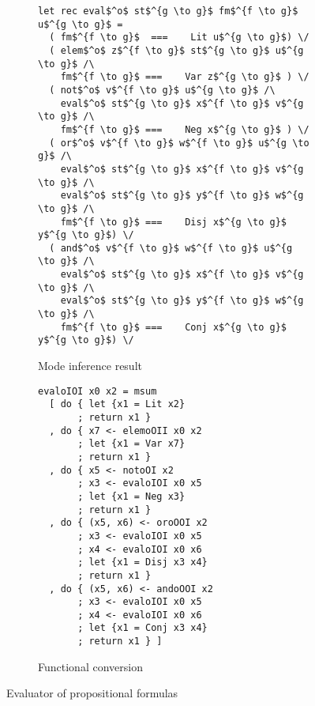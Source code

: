\begin{figure}[h]
  \centering
  \begin{subfigure}[b]{0.45\textwidth}
    \begin{lstlisting}[frame=tb]
let rec eval$^o$ st$^{g \to g}$ fm$^{f \to g}$ u$^{g \to g}$ =
  ( fm$^{f \to g}$  ===    Lit u$^{g \to g}$) \/
  ( elem$^o$ z$^{f \to g}$ st$^{g \to g}$ u$^{g \to g}$ /\
    fm$^{f \to g}$ ===    Var z$^{g \to g}$ ) \/
  ( not$^o$ v$^{f \to g}$ u$^{g \to g}$ /\
    eval$^o$ st$^{g \to g}$ x$^{f \to g}$ v$^{g \to g}$ /\
    fm$^{f \to g}$ ===    Neg x$^{g \to g}$ ) \/
  ( or$^o$ v$^{f \to g}$ w$^{f \to g}$ u$^{g \to g}$ /\
    eval$^o$ st$^{g \to g}$ x$^{f \to g}$ v$^{g \to g}$ /\
    eval$^o$ st$^{g \to g}$ y$^{f \to g}$ w$^{g \to g}$ /\
    fm$^{f \to g}$ ===    Disj x$^{g \to g}$ y$^{g \to g}$) \/
  ( and$^o$ v$^{f \to g}$ w$^{f \to g}$ u$^{g \to g}$ /\
    eval$^o$ st$^{g \to g}$ x$^{f \to g}$ v$^{g \to g}$ /\
    eval$^o$ st$^{g \to g}$ y$^{f \to g}$ w$^{g \to g}$ /\
    fm$^{f \to g}$ ===    Conj x$^{g \to g}$ y$^{g \to g}$) \/
    \end{lstlisting}
   \caption{Mode inference result}
    \label{fig:prop_modded}
  \end{subfigure}
  \hfill
  \begin{subfigure}[b]{0.45\textwidth}
    \begin{lstlisting}[frame=tb]
evaloIOI x0 x2 = msum
  [ do { let {x1 = Lit x2}
       ; return x1 }
  , do { x7 <- elemoOII x0 x2
       ; let {x1 = Var x7}
       ; return x1 }
  , do { x5 <- notoOI x2
       ; x3 <- evaloIOI x0 x5
       ; let {x1 = Neg x3}
       ; return x1 }
  , do { (x5, x6) <- oroOOI x2
       ; x3 <- evaloIOI x0 x5
       ; x4 <- evaloIOI x0 x6
       ; let {x1 = Disj x3 x4}
       ; return x1 }
  , do { (x5, x6) <- andoOOI x2
       ; x3 <- evaloIOI x0 x5
       ; x4 <- evaloIOI x0 x6
       ; let {x1 = Conj x3 x4}
       ; return x1 } ]
    \end{lstlisting}
    \caption{Functional conversion}
    \label{fig:prop_hsk}
  \end{subfigure}
  \caption{Evaluator of propositional formulas}
  \label{fig:prop}
\end{figure}
